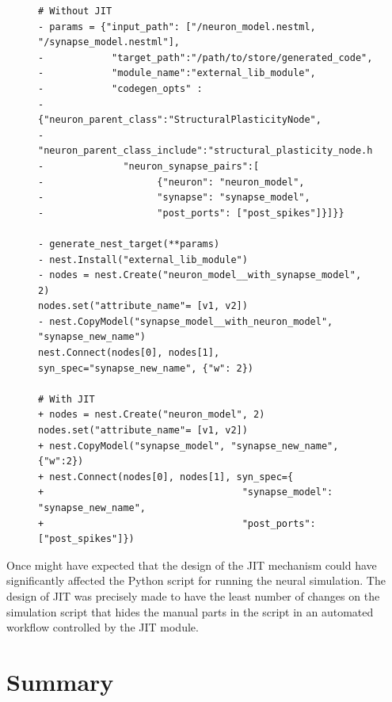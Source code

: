 \begin{figure}[ht!]
\centering
\begin{lstlisting}[language=Pydiff, label=lst:create_connect_diff, caption={ Installing new models and creating the network with and without the JIT mechanism. Lines that are necessary without the JIT module are shown in red, lines in the new version are shown in green.}]
# Without JIT
- params = {"input_path": ["/neuron_model.nestml, "/synapse_model.nestml"],
-            "target_path":"/path/to/store/generated_code",
-            "module_name":"external_lib_module",
-            "codegen_opts" : 
-             {"neuron_parent_class":"StructuralPlasticityNode",
-              "neuron_parent_class_include":"structural_plasticity_node.h",
-              "neuron_synapse_pairs":[ 
-                    {"neuron": "neuron_model",
-                    "synapse": "synapse_model", 
-                    "post_ports": ["post_spikes"]}]}}

- generate_nest_target(**params)
- nest.Install("external_lib_module")
- nodes = nest.Create("neuron_model__with_synapse_model", 2)
nodes.set("attribute_name"= [v1, v2])
- nest.CopyModel("synapse_model__with_neuron_model", "synapse_new_name")
nest.Connect(nodes[0], nodes[1], syn_spec="synapse_new_name", {"w": 2})

# With JIT
+ nodes = nest.Create("neuron_model", 2)
nodes.set("attribute_name"= [v1, v2])
+ nest.CopyModel("synapse_model", "synapse_new_name", {"w":2})
+ nest.Connect(nodes[0], nodes[1], syn_spec={
+                                   "synapse_model": "synapse_new_name",
+                                   "post_ports": ["post_spikes"]})

\end{lstlisting}
\end{figure}


Once might have expected that the design of the JIT mechanism could have significantly affected the Python script for running the neural simulation. The design of JIT was precisely made to have the least number of changes on the simulation script that hides the manual parts in the script in an automated workflow controlled by the JIT module.


\section{Summary}

